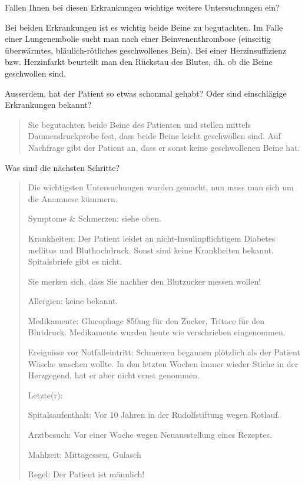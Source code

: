 
Fallen Ihnen bei diesen Erkrankungen wichtige weitere Untersuchungen
ein?

Bei beiden Erkrankungen ist es wichtig beide Beine zu begutachten. Im
Falle einer Lungenembolie sucht man nach einer Beinvenenthrombose
(einseitig überwärmtes, bläulich-rötliches geschwollenes Bein).
Bei einer Herzinsuffizienz bzw. Herzinfarkt beurteilt man den
Rückstau des Blutes, dh. ob die Beine geschwollen sind.

Ausserdem, hat der Patient so etwas schonmal gehabt? Oder sind einschlägige
Erkrankungen bekannt?  

\begin{quote}
Sie begutachten beide Beine des Patienten und stellen mittels
Daumendruckprobe fest, dass beide Beine leicht geschwollen sind. Auf
Nachfrage gibt der Patient an, dass er sonst keine geschwollenen Beine
hat. 
\end{quote}

Was sind die nächsten Schritte?

\begin{quote}
Die wichtigsten Untersuchungen wurden gemacht, nun muss man sich um die
Anamnese kümmern. 

Symptome \& Schmerzen: siehe oben.

Krankheiten: Der Patient leidet an nicht-Insulinpflichtigem Diabetes
mellitus und Bluthochdruck. Sonst sind keine Krankheiten bekannt.
Spitalsbriefe gibt es nicht. 

Sie merken sich, dass Sie nachher den Blutzucker messen wollen!

Allergien: keine bekannt.

Medikamente: Glucophage 850mg für den Zucker, Tritace für den
Blutdruck. Medikamente wurden heute wie verschrieben eingenommen. 

Ereignisse vor Notfalleintritt: Schmerzen begannen plötzlich als der
Patient Wäsche waschen wollte. In den letzten Wochen immer wieder
Stiche in der Herzgegend, hat er aber nicht ernst genommen. 

Letzte(r):

Spitalsaufenthalt: Vor 10 Jahren in der Rudolfstiftung wegen Rotlauf.

Arztbesuch: Vor einer Woche wegen Neuausstellung eines Rezeptes.

Mahlzeit: Mittagessen, Gulasch

Regel: Der Patient ist männlich!
\end{quote}
% 

